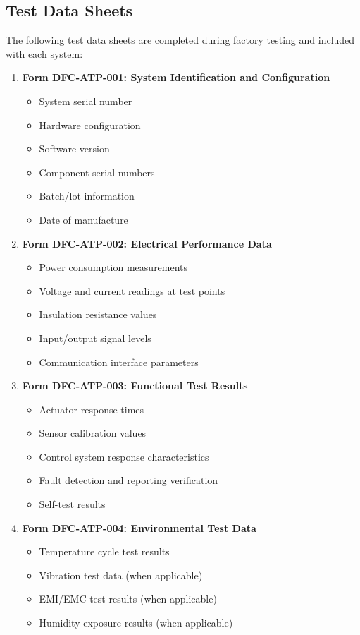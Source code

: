 \documentclass[12pt,a4paper,twoside,openright]{book}
\begin{document}
\subsection{Test Data Sheets}

The following test data sheets are completed during factory testing and included with each system:

\begin{enumerate}
    \item \textbf{Form DFC-ATP-001: System Identification and Configuration}
    \begin{itemize}
        \item System serial number
        \item Hardware configuration
        \item Software version
        \item Component serial numbers
        \item Batch/lot information
        \item Date of manufacture
    \end{itemize}
    
    \item \textbf{Form DFC-ATP-002: Electrical Performance Data}
    \begin{itemize}
        \item Power consumption measurements
        \item Voltage and current readings at test points
        \item Insulation resistance values
        \item Input/output signal levels
        \item Communication interface parameters
    \end{itemize}
    
    \item \textbf{Form DFC-ATP-003: Functional Test Results}
    \begin{itemize}
        \item Actuator response times
        \item Sensor calibration values
        \item Control system response characteristics
        \item Fault detection and reporting verification
        \item Self-test results
    \end{itemize}
    
    \item \textbf{Form DFC-ATP-004: Environmental Test Data}
    \begin{itemize}
        \item Temperature cycle test results
        \item Vibration test data (when applicable)
        \item EMI/EMC test results (when applicable)
        \item Humidity exposure results (when applicable)
    \end{itemize}
    

\end{enumerate}
\end{document}
